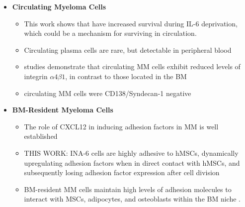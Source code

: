 \begin{itemize}
      \item \textbf{Circulating Myeloma Cells}
            \begin{itemize}
                  \item This work shows that \nMAina have increased survival
                        during IL-6 deprivation, which could be a mechanism for
                        surviving in circulation.
                  \item Circulating plasma cells are rare, but detectable in
                        peripheral blood
                        \cite{witzigDetectionMyelomaCells1996}
                  \item studies demonstrate that circulating \ac{MM} cells
                        exhibit reduced levels of integrin $\alpha4\beta1$, in
                        contrast to those located in the \ac{BM}
                        \cite{paivaDetailedCharacterizationMultiple2013,
                              paivaCompetitionClonalPlasma2011}
                  \item circulating MM cells were CD138/Syndecan-1 negative
                        \cite{akhmetzyanovaDynamicCD138Surface2020}

            \end{itemize}

      \item \textbf{BM-Resident Myeloma Cells}
            \begin{itemize}
                  \item The role of CXCL12  in inducing adhesion factors in MM is well established
                        \cite{ullahRoleCXCR4Multiple2019}
                  \item THIS WORK: INA-6 cells are highly adhesive to hMSCs, dynamically
                        upregulating adhesion factors when in direct contact with
                        hMSCs, and subsequently losing adhesion factor expression after
                        cell division
                  \item BM-resident MM cells maintain high levels of adhesion
                        molecules to interact with MSCs, adipocytes, and osteoblasts
                        within the BM niche \cite{bouzerdanAdhesionMoleculesMultiple2022, burgerGp130RasMediated2001, chatterjeePresenceBoneMarrow2002}.
            \end{itemize}

\end{itemize}


